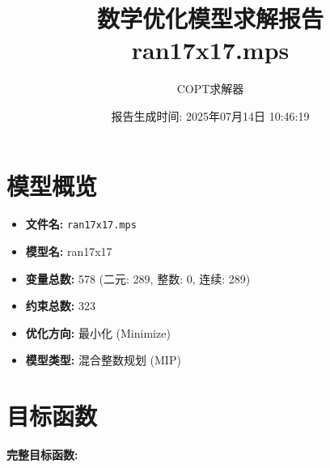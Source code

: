 \documentclass[a4paper,10pt]{article}
\title{数学优化模型求解报告\\{\large ran17x17.mps}}
\author{COPT求解器}
\date{报告生成时间: 2025年07月14日 10:46:19}
\begin{document}
\maketitle
\tableofcontents
\newpage

\section{模型概览}
\begin{itemize}
    \item \textbf{文件名:} \texttt{ran17x17.mps}
    \item \textbf{模型名:} ran17x17
    \item \textbf{变量总数:} 578 (二元: 289, 整数: 0, 连续: 289)
    \item \textbf{约束总数:} 323
    \item \textbf{优化方向:} 最小化 (Minimize)
    \item \textbf{模型类型:} 混合整数规划 (MIP)
\end{itemize}
\section{目标函数}

\textbf{完整目标函数:}
\end{document}
